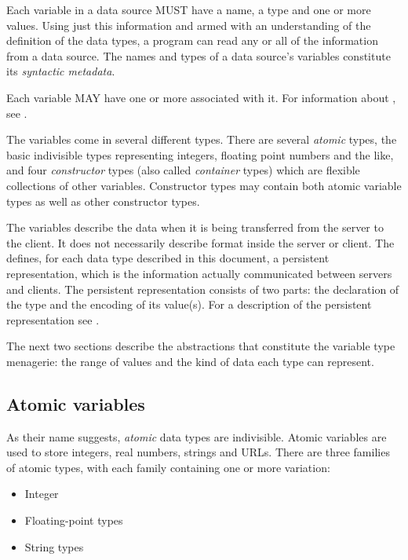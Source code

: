 \documentclass[justify]{nasa-ese}
\renewcommand{\new}[1]{\emph{#1}}
\begin{document}

Each variable in a data source MUST have a name, a type and one or more
values. Using just this information and armed with an understanding of the
definition of the \DAP data types, a program can read any or all of the
information from a data source. The names and types of a data source's
variables constitute its \new{syntactic metadata}\cite{cornillon03}.

Each variable MAY have one or more \Attributes associated with it.  For
information about \Attributes, see .

The \DAP variables come in several different types. There are several
\new{atomic} types, the basic indivisible types representing integers,
floating point numbers and the like, and four \new{constructor} types (also
called \new{container} types)  which are flexible collections of
other variables.  Constructor types may contain both atomic variable
types as well as other constructor types.

The \DAP variables describe the data when it is being transferred from
the server to the client. It does not necessarily describe format
inside the server or client. The \DAP defines, for each data type
described in this document, a persistent representation, which is the
information actually communicated between \DAP servers and \DAP
clients. The persistent representation consists of two parts: the
declaration of the type and the encoding of its value(s). For a
description of the persistent representation see
.

The next two sections describe the abstractions that constitute the variable
type menagerie: the range of values and the kind of data each type can
represent.

\subsection{Atomic variables}
\label{sec-atomic-variables}

As their name suggests, \new{atomic} data types are indivisible.
Atomic variables are used to store integers, real numbers, strings and
URLs. There are three families of atomic types, with each family
containing one or more variation:

\begin{itemize}
\item Integer
\item Floating-point types
\item String types
\end{itemize}
\end{document}
